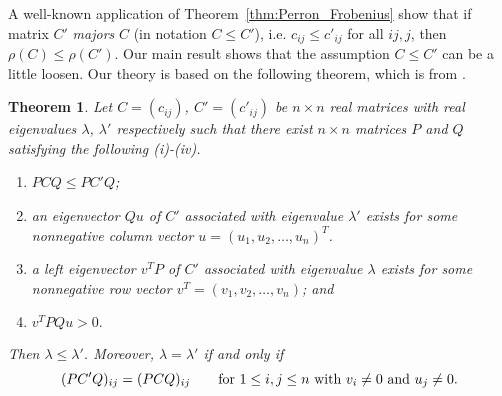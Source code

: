 \documentclass[12pt, a4paper]{article}
\theoremstyle{plain}
\newtheorem{thm}{Theorem}[section]
\theoremstyle{definition}
\begin{document}
 A well-known application of Theorem~\ref{thm:Perron_Frobenius}
 show that if matrix  $C'$ {\it majors} $C$ (in notation $C\leq C'$),
 i.e. $c_{ij}\leq c'_{ij}$ for all $ij,j$, then $\rho(C)\leq \rho(C')$.
Our main result shows that the assumption $C\leq C'$ can be a little loosen. 
Our theory is based on the following theorem, which is from \cite{chang}. 





\begin{thm}\label{pre_thm}
    Let $C=(c_{ij})$, $C'=(c'_{ij})$  be $n\times n$ real matrices
     with real eigenvalues $\lambda$, $\lambda'$ respectively such
     that there exist $n\times n$ matrices $P$ and $Q$   satisfying the following (i)-(iv).
\begin{enumerate}[label=(\roman*)]
    \item \label{pre_thm_em1}  $PCQ\leq PC'Q$;
    \item \label{pre_thm_em2} an eigenvector $Qu$ of $C'$  associated with
     eigenvalue $\lambda'$ exists for some nonnegative column vector
      $u=(u_1, u_2, \ldots, u_n)^T$.
    \item \label{pre_thm_em3} a left eigenvector $v^TP$ of $C'$ associated
     with eigenvalue $\lambda$ exists for some nonnegative row vector
     $v^T=(v_1, v_2, \ldots, v_n)$; and
    \item \label{pre_thm_em4} $v^TPQu>0.$
\end{enumerate}
    Then $\lambda\leq \lambda'$. Moreover, $\lambda=\lambda'$ if and only if
    \begin{equation}\label{pre0}
        (PC'Q)_{ij}=(PCQ)_{ij}\qquad \hbox{for~}1\leq i, j\leq n \hbox{~with~} v_i\ne 0 \hbox{~and~} u_j\ne 0.
    \end{equation}
\end{thm}
\end{document}

